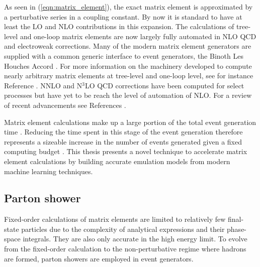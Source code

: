 \documentclass[main.tex]{subfiles}
\begin{document}
    As seen in (\ref{eqn:matrix_element}),
    the exact matrix element is approximated by a perturbative
    series in a coupling constant. By now it is standard to
    have at least the LO and NLO contributions in this expansion.
    The calculations of
    tree-level \cite{Mangano:2002ea,Krauss:2001iv,Gleisberg:2008fv,Cafarella:2007pc,Alwall:2011uj,Kilian:2007gr}
    and one-loop \cite{Berger:2008sj,Cullen:2011ac,Cullen:2014yla,Bevilacqua:2011xh,Hirschi:2011pa,Alwall:2014hca,Frederix:2018nkq,Campbell:1999ah,Campbell:2021vlt,Badger:2012pg,Cascioli:2011va,Buccioni:2019sur,Actis:2016mpe,Denner:2017wsf}
    matrix elements are now largely fully automated
    in NLO QCD and electroweak corrections.
    Many of the modern matrix element generators are supplied
    with a common generic interface to event generators,
    the Binoth Les Houches Accord \cite{Binoth:2010xt,Alioli:2013nda}.
    For more information on the machinery developed to
    compute nearly arbitrary matrix elements at tree-level and
    one-loop level, see for instance Reference \cite{Campbell:2017hsr}.
    NNLO and N$^{3}$LO QCD corrections have been computed
    for select processes but have yet to be reach the
    level of automation of NLO.
    For a review of recent advancements see References \cite{Caola:2022ayt,Campbell:2022qmc}.
    
    Matrix element calculations make up a large
    portion of the total event generation time \cite{Bothmann:2022thx}.
    Reducing the time spent in this stage of the event
    generation therefore represents a sizeable increase
    in the number of events generated given a fixed computing
    budget \cite{HSFPhysicsEventGeneratorWG:2020gxw}.
    This thesis presents a novel technique to
    accelerate matrix element calculations by building
    accurate emulation models from modern machine learning
    techniques.

    \subsection*{Parton shower}\label{sec:parton_showers}
    Fixed-order calculations of matrix elements are limited
    to relatively few final-state particles due to the complexity
    of analytical expressions and their phase-space integrals.
    They are also only accurate in the high energy limit.
    To evolve from the fixed-order
    calculation to the non-perturbative regime where hadrons
    are formed, parton showers are employed in event generators.
\end{document}
